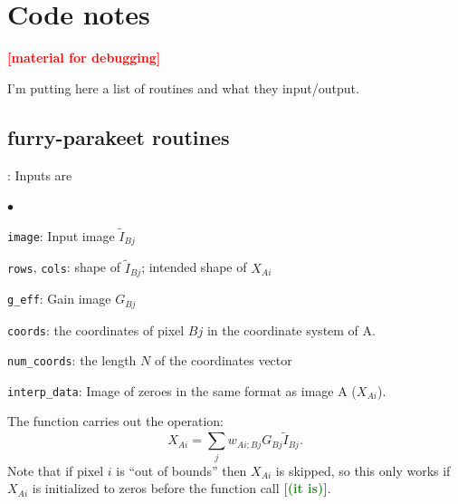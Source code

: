 \documentclass[12pt]{pasj01}
\newcommand{\Katherine}[1]{{\textcolor{ForestGreen}{\bfseries{[#1]}}}}
\newcommand{\Chris}[1]{{\textcolor{red}{\bfseries{[#1]}}}}
\begin{document}

\appendix\label{app:codenotes}

\section{Code notes}

\Chris{material for debugging}

I'm putting here a list of routines and what they input/output.

\subsection{furry-parakeet routines}

: Inputs are
\begin{list}{$\bullet$}{}
\item {\tt image}: Input image $\tilde I_{Bj}$
\item {\tt rows}, {\tt cols}: shape of $\tilde I_{Bj}$; intended shape of $X_{Ai}$
\item {\tt g\_eff}: Gain image $G_{Bj}$ 
\item {\tt coords}: the coordinates of pixel $Bj$ in the coordinate system of A. 
\item {\tt num\_coords}: the length $N$ of the coordinates vector
\item {\tt interp\_data}: Image of zeroes in the same format as image A ($X_{Ai}$).
\end{list}
The function carries out the operation:
\begin{equation}
    X_{Ai} = \sum_j w_{Ai;Bj} G_{Bj} \tilde I_{Bj}.
\end{equation}
Note that if pixel $i$ is ``out of bounds'' then $X_{Ai}$ is skipped, so this only works if $X_{Ai}$ is initialized to zeros before the function call \Katherine{(it is)}.

\vskip 0.05in
\end{document}

